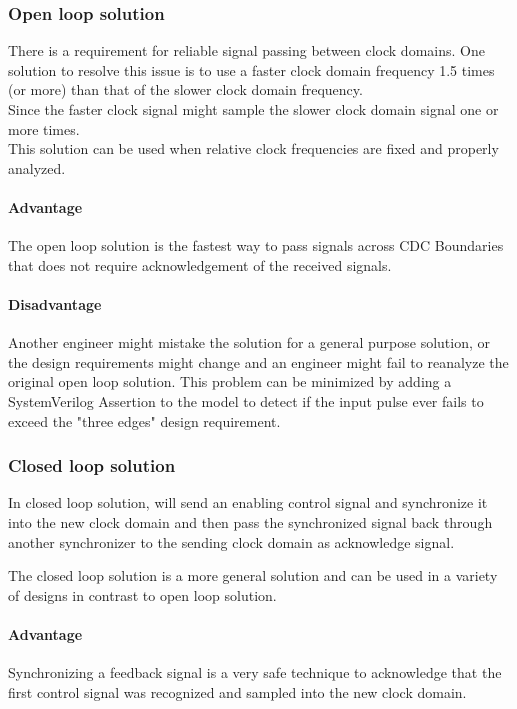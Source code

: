 \subsubsection{Open loop solution}
There is a requirement for reliable signal passing between clock domains. One solution to resolve this issue is to use a faster clock domain frequency 1.5 times (or more) than that of the slower clock domain frequency.\\
Since the faster clock signal might sample the slower clock domain signal one or more times.\\
This solution can be used when relative clock frequencies are fixed and properly analyzed.

\paragraph{Advantage}
The open loop solution is the fastest way to pass signals across CDC Boundaries that does not require acknowledgement of the received signals.

\paragraph{Disadvantage}
Another engineer might mistake the solution for a general purpose solution, or the design requirements
might change and an engineer might fail to reanalyze the original open loop solution. This problem can be minimized by adding a SystemVerilog Assertion to the model to detect if the input pulse ever fails to exceed the "three edges" design requirement.


\subsubsection{Closed loop solution}
In closed loop solution,  will send an enabling control signal and synchronize it into the new clock domain and then pass the synchronized signal back through another synchronizer to the sending clock domain as acknowledge signal.

The closed loop solution is a more general solution and can be used in a variety of designs in contrast to open loop solution.

\paragraph{Advantage} Synchronizing a feedback signal is a very safe technique to acknowledge that the first control signal was recognized and sampled into the new clock domain.

